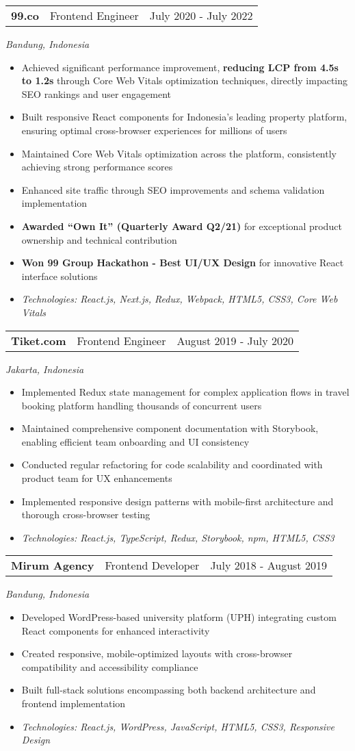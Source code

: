 \documentclass[a4paper, 11pt]{article}
\newcommand{\resumeItem}[1]{
  \item\small{
    {#1 \vspace{-2pt}}
  }
}
\newcommand{\resumeSubheading}[4]{
  \vspace{-2pt}\item
    \begin{tabularx}{0.987\textwidth}[t]{
  >{\raggedright\arraybackslash}X
  >{\centering\arraybackslash}X
  >{\raggedleft\arraybackslash}X }
      \textbf{#1} & #2 & #3 \\
    \end{tabularx}
    \textit{\small#4}\\
    \vspace{-7pt}
}
\newcommand{\resumeItemListStart}{\begin{itemize}[leftmargin=0.22in]}
\newcommand{\resumeItemListEnd}{\end{itemize}\vspace{-20pt}}
\begin{document}
    \resumeSubheading
      {99.co}{Frontend Engineer}{July 2020 - July 2022}
      {Bandung, Indonesia}
      \resumeItemListStart
        \resumeItem{Achieved significant performance improvement, \textbf{reducing LCP from 4.5s to 1.2s} through Core Web Vitals optimization techniques, directly impacting SEO rankings and user engagement}
        \resumeItem{Built responsive React components for Indonesia's leading property platform, ensuring optimal cross-browser experiences for millions of users}
        \resumeItem{Maintained Core Web Vitals optimization across the platform, consistently achieving strong performance scores}
        \resumeItem{Enhanced site traffic through SEO improvements and schema validation implementation}
        \resumeItem{\textbf{Awarded ``Own It'' (Quarterly Award Q2/21)} for exceptional product ownership and technical contribution}
        \resumeItem{\textbf{Won 99 Group Hackathon - Best UI/UX Design} for innovative React interface solutions}
        \resumeItem{\textit{Technologies: React.js, Next.js, Redux, Webpack, HTML5, CSS3, Core Web Vitals}}
      \resumeItemListEnd

    \resumeSubheading
      {Tiket.com}{Frontend Engineer}{August 2019 - July 2020}
      {Jakarta, Indonesia}
      \resumeItemListStart
        \resumeItem{Implemented Redux state management for complex application flows in travel booking platform handling thousands of concurrent users}
        \resumeItem{Maintained comprehensive component documentation with Storybook, enabling efficient team onboarding and UI consistency}
        \resumeItem{Conducted regular refactoring for code scalability and coordinated with product team for UX enhancements}
        \resumeItem{Implemented responsive design patterns with mobile-first architecture and thorough cross-browser testing}
        \resumeItem{\textit{Technologies: React.js, TypeScript, Redux, Storybook, npm, HTML5, CSS3}}
      \resumeItemListEnd

    \resumeSubheading
      {Mirum Agency}{Frontend Developer}{July 2018 - August 2019}
      {Bandung, Indonesia}
      \resumeItemListStart
        \resumeItem{Developed WordPress-based university platform (UPH) integrating custom React components for enhanced interactivity}
        \resumeItem{Created responsive, mobile-optimized layouts with cross-browser compatibility and accessibility compliance}
        \resumeItem{Built full-stack solutions encompassing both backend architecture and frontend implementation}
        \resumeItem{\textit{Technologies: React.js, WordPress, JavaScript, HTML5, CSS3, Responsive Design}}
      \resumeItemListEnd
\end{document}
